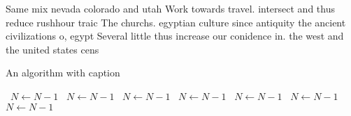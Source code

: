 \documentclass[a4paper]{article}
\begin{document}
Same mix nevada colorado and utah Work towards travel. intersect and thus reduce rushhour traic The churchs. egyptian culture since antiquity the ancient civilizations o, egypt Several little thus increase our conidence in. the west and the united states cens

\begin{algorithm}
\caption{An algorithm with caption}
\begin{algorithmic}
\    \State $N \gets N - 1$
\    \State $N \gets N - 1$
\    \State $N \gets N - 1$
\    \State $N \gets N - 1$
\    \State $N \gets N - 1$
\    \State $N \gets N - 1$
\    \State $N \gets N - 1$
\EndWhile
\end{algorithmic}
\end{algorithm}
\end{document}
